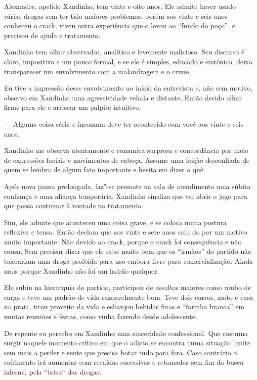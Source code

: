  

Alexandre, apelido Xandinho, tem vinte e oito anos. Ele admite haver
usado várias drogas sem ter tido maiores problemas, porém aos vinte e
seis anos conheceu o crack, viveu outra experiência que o levou ao
``fundo do poço'', e precisou de ajuda e tratamento.

Xandinho tem olhar observador, analítico e levemente malicioso. Seu
discurso é claro, impositivo e um pouco formal, e se ele é simples,
educado e sintônico, deixa transparecer um envolvimento com a
malandragem e o crime.

Eu tive a impressão desse envolvimento no início da entrevista e, não
sem motivo, observo em Xandinho uma agressividade velada e distante.
Então decido olhar firme para ele e arriscar um palpite intuitivo.

— Alguma coisa séria e incomum deve ter acontecido com você aos vinte e
seis anos.

Xandinho me observa atentamente e comunica surpresa e concordância por
meio de expressões faciais e movimentos de cabeça. Assume uma feição
desconfiada de quem se lembra de algum fato importante e hesita em dizer
o quê.

Após nova pausa prolongada, faz"-se presente na sala de atendimento uma
súbita confiança e uma aliança temporária. Xandinho sinaliza que vai
abrir o jogo para que possa continuar à vontade no tratamento.

Sim, ele admite que aconteceu uma coisa grave, e se coloca numa postura
reflexiva e tensa. Então declara que aos vinte e sete anos saiu do 
por um motivo muito importante. Não devido ao crack, porque o crack foi
consequência e não causa. Sem precisar dizer que ele sabe muito bem que
os ``irmãos'' do partido não tolerariam uma droga proibida para uso
embora livre para comercialização. Ainda mais porque Xandinho não foi um
ladrão qualquer.

Ele subiu na hierarquia do partido, participou de assaltos maiores como
roubo de carga e teve um padrão de vida razoavelmente bom. Teve dois
carros, moto e casa na praia, tirou proveito da vida e esbanjou bebidas
finas e ``farinha branca'' em muitas reuniões e festas, como vinha
fazendo desde adolescente.

De repente eu percebo em Xandinho uma sinceridade confessional. Que
costuma surgir naquele momento crítico em que o adicto se encontra numa
situação limite sem mais a perder e sente que precisa botar tudo para
fora. Caso contrário o sofrimento irá aumentar com recaídas sucessivas e
retomadas sem fim da busca infernal pela ``brisa`` das drogas.

